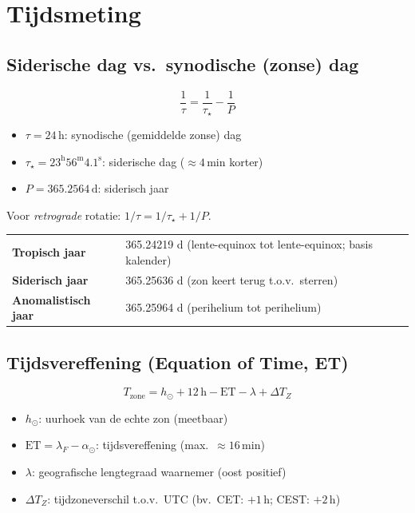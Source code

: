 \documentclass[11pt, a4paper]{article}
\newcommand{\zon}{\odot}
\begin{document}
\section{Tijdsmeting}

\subsection{Siderische dag vs.\ synodische (zonse) dag}

\begin{formule}
\[
  \frac{1}{\tau} = \frac{1}{\tau_\star} - \frac{1}{P}
\]
\begin{itemize}[leftmargin=1.5em, itemsep=2pt]
  \item $\tau = 24\,\mathrm{h}$: synodische (gemiddelde zonse) dag
  \item $\tau_\star = 23^\mathrm{h}56^\mathrm{m}4.1^\mathrm{s}$: siderische dag ($\approx 4\,\mathrm{min}$ korter)
  \item $P = 365.2564\,\mathrm{d}$: siderisch jaar
\end{itemize}
Voor \emph{retrograde} rotatie: $1/\tau = 1/\tau_\star + 1/P$.
\end{formule}

\begin{weetje}
\renewcommand{\arraystretch}{1.3}
\begin{tabular}{ll}
  \textbf{Tropisch jaar}      & 365.24219 d \quad (lente-equinox tot lente-equinox; basis kalender) \\
  \textbf{Siderisch jaar}     & 365.25636 d \quad (zon keert terug t.o.v.\ sterren) \\
  \textbf{Anomalistisch jaar} & 365.25964 d \quad (perihelium tot perihelium) \\
\end{tabular}
\end{weetje}

\subsection{Tijdsvereffening (Equation of Time, ET)}

\begin{formule}
\[
  \boxed{T_\mathrm{zone} = h_\zon + 12\,\mathrm{h} - \mathrm{ET} - \lambda + \Delta T_Z}
\]
\begin{itemize}[leftmargin=1.5em, itemsep=2pt]
  \item $h_\zon$: uurhoek van de echte zon (meetbaar)
  \item $\mathrm{ET} = \lambda_F - \alpha_\zon$: tijdsvereffening (max.\ $\approx 16\,\mathrm{min}$)
  \item $\lambda$: geografische lengtegraad waarnemer (oost positief)
  \item $\Delta T_Z$: tijdzoneverschil t.o.v.\ UTC (bv.\ CET: $+1\,\mathrm{h}$; CEST: $+2\,\mathrm{h}$)
\end{itemize}
\end{formule}
\end{document}
